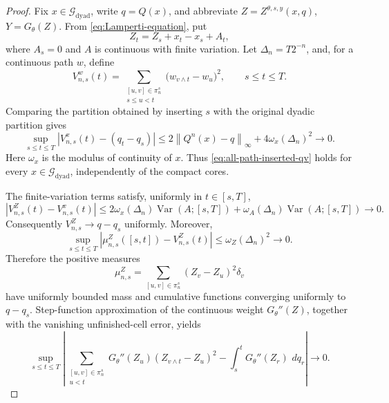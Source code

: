 \documentclass[10pt,a4paper]{amsart}
\newcommand{\Var}{\operatorname{Var}}
\newcommand{\cG}{\mathcal G}
\newcommand{\dd}{\,d}
\newcommand{\norm}[1]{\left\lVert #1\right\rVert}
\begin{document}
\begin{proof}
Fix \(x\in\cG_{\mathrm{dyad}}\), write \(q=Q(x)\), and abbreviate
\(Z=Z^{\theta,s,y}(x,q)\), \(Y=G_\theta(Z)\).  From
\eqref{eq:Lamperti-equation}, put
\[
  Z_t=Z_s+x_t-x_s+A_t,
\]
where \(A_s=0\) and \(A\) is continuous with finite variation.  Let
\(\Delta_n=T2^{-n}\), and, for a continuous path \(w\), define
\[
  V_{n,s}^w(t)
  =
  \sum_{\substack{[u,v]\in\pi_n^s\\s\le u<t}}
    \bigl(w_{v\wedge t}-w_u\bigr)^2,
  \qquad s\le t\le T.
\]
Comparing the partition obtained by inserting \(s\) with the original
dyadic partition gives
\begin{equation}\label{eq:all-path-inserted-qv}
  \sup_{s\le t\le T}
  \left|
    V_{n,s}^x(t)-(q_t-q_s)
  \right|
  \le
  2\norm{Q^n(x)-q}_\infty+4\omega_x(\Delta_n)^2
  \longrightarrow0.
\end{equation}
Here \(\omega_x\) is the modulus of continuity of \(x\).  Thus
\eqref{eq:all-path-inserted-qv} holds for every
\(x\in\cG_{\mathrm{dyad}}\), independently of the compact cores.

The finite-variation terms satisfy, uniformly in \(t\in[s,T]\),
\[
  \left|V_{n,s}^Z(t)-V_{n,s}^x(t)\right|
  \le
  2\omega_x(\Delta_n)\Var(A;[s,T])
  +\omega_A(\Delta_n)\Var(A;[s,T])
  \longrightarrow0.
\]
Consequently \(V_{n,s}^Z\to q-q_s\) uniformly.  Moreover,
\[
  \sup_{s\le t\le T}
  \left|
    \mu_{n,s}^Z([s,t])-V_{n,s}^Z(t)
  \right|
  \le \omega_Z(\Delta_n)^2\longrightarrow0.
\]
Therefore the positive measures
\[
  \mu_{n,s}^Z
  =\sum_{[u,v]\in\pi_n^s}(Z_v-Z_u)^2\delta_v
\]
have uniformly bounded mass and cumulative functions converging uniformly to
\(q-q_s\).  Step-function approximation of the continuous weight
\(G_\theta''(Z)\), together with the vanishing unfinished-cell error, yields
\begin{equation}\label{eq:all-path-weighted-qv}
  \sup_{s\le t\le T}
  \left|
    \sum_{\substack{[u,v]\in\pi_n^s\\u<t}}
      G_\theta''(Z_u)(Z_{v\wedge t}-Z_u)^2
    -\int_s^tG_\theta''(Z_r)\,\dd q_r
  \right|
  \longrightarrow0.
\end{equation}


\end{proof}
\end{document}

